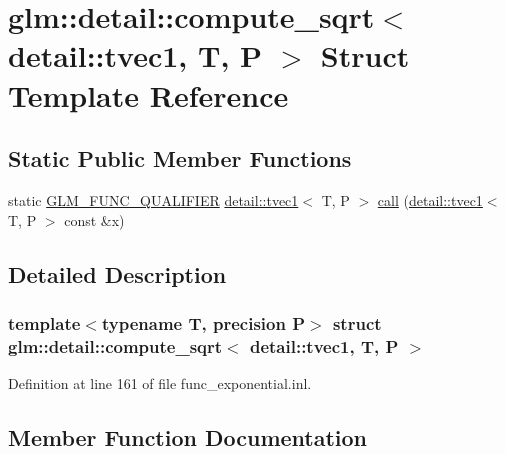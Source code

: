 \hypertarget{structglm_1_1detail_1_1compute__sqrt_3_01detail_1_1tvec1_00_01_t_00_01_p_01_4}{}\section{glm\+:\+:detail\+:\+:compute\+\_\+sqrt$<$ detail\+:\+:tvec1, T, P $>$ Struct Template Reference}
\label{structglm_1_1detail_1_1compute__sqrt_3_01detail_1_1tvec1_00_01_t_00_01_p_01_4}
\subsection*{Static Public Member Functions}
\begin{DoxyCompactItemize}
\item 
static \hyperlink{setup_8hpp_a33fdea6f91c5f834105f7415e2a64407}{G\+L\+M\+\_\+\+F\+U\+N\+C\+\_\+\+Q\+U\+A\+L\+I\+F\+I\+ER} \hyperlink{structglm_1_1detail_1_1tvec1}{detail\+::tvec1}$<$ T, P $>$ \hyperlink{structglm_1_1detail_1_1compute__sqrt_3_01detail_1_1tvec1_00_01_t_00_01_p_01_4_a19be057111b1a9d9459f75355ac256f5}{call} (\hyperlink{structglm_1_1detail_1_1tvec1}{detail\+::tvec1}$<$ T, P $>$ const \&x)
\end{DoxyCompactItemize}


\subsection{Detailed Description}
\subsubsection*{template$<$typename T, precision P$>$\newline
struct glm\+::detail\+::compute\+\_\+sqrt$<$ detail\+::tvec1, T, P $>$}



Definition at line 161 of file func\+\_\+exponential.\+inl.



\subsection{Member Function Documentation}
\mbox{\label{structglm_1_1detail_1_1compute__sqrt_3_01detail_1_1tvec1_00_01_t_00_01_p_01_4_a19be057111b1a9d9459f75355ac256f5}} 
